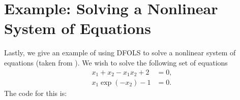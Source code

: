 \documentclass[letterpaper,10pt,english]{sphinxmanual}
\begin{document}
\section{Example: Solving a Nonlinear System of Equations}
\label{\detokenize{userguide:example-solving-a-nonlinear-system-of-equations}}
\sphinxAtStartPar
Lastly, we give an example of using DFO\sphinxhyphen{}LS to solve a nonlinear system of equations (taken from ). We wish to solve the following set of equations
\begin{equation*}
\begin{split}x_1 + x_2 - x_1 x_2 + 2 &= 0, \\
x_1 \exp(-x_2) - 1 &= 0.\end{split}
\end{equation*}
\sphinxAtStartPar
The code for this is:
\end{document}
